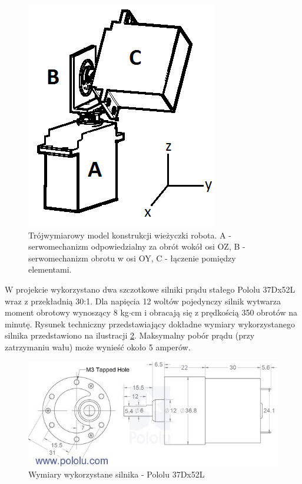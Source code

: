   \begin{figure}[H]
    \begin{center}
      \includegraphics[scale=0.45]{imgs/wieza_3d.png}
 	\caption[Model wieżyczki.]{\small{Trójwymiarowy model konstrukcji wieżyczki robota. A - serwomechanizm odpowiedzialny za obrót wokół osi OZ, B - serwomechanizm obrotu w osi OY, C - łączenie pomiędzy elementami.}}
	\label{wieza3d}
    \end{center}
  \end{figure}
W projekcie wykorzystano dwa szczotkowe silniki prądu stałego Pololu 37Dx52L wraz z przekładnią 30:1. Dla napięcia 12 woltów pojedynczy silnik wytwarza moment obrotowy wynoszący 8 kg$\cdot$cm i obracają się z prędkością 350 obrotów na minutę. Rysunek techniczny przedstawiający dokładne wymiary wykorzystanego silnika przedstawiono na ilustracji \ref{wymiary_silnika}. Maksymalny pobór prądu (przy zatrzymaniu wału) może wynieść około 5 amperów.

  \begin{figure}[H]
    \begin{center}
      \includegraphics[scale=0.7]{imgs/silnik_wymiary.png}
 	\caption[Wymiary silnika Pololu 37Dx52L ]{\small{Wymiary wykorzystane silnika - Pololu 37Dx52L }\footnotemark}
	\label{wymiary_silnika}
    \end{center}
  \end{figure}

